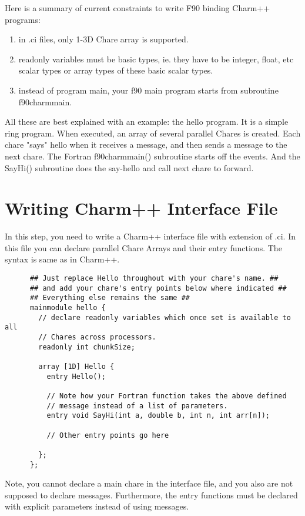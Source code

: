 \documentclass[11pt]{article}
\begin{document}
Here is a summary of current constraints to write F90 binding Charm++ programs:
\begin{enumerate}
\item in .ci files, only 1-3D Chare array is supported.
\item readonly variables must be basic types, ie. they have to be integer, 
float, etc scalar types or array types of these basic scalar types.
\item instead of program main, your f90 main program starts from subroutine 
f90charmmain.
\end{enumerate}

All these are best explained with an example: the hello program.  It is a
simple ring program.  When executed, an array of several parallel
Chares is created.  Each chare "says" hello when it receives a
message, and then sends a message to the next chare. The Fortran f90charmmain() 
subroutine starts off the events.  And the SayHi() subroutine does the 
say-hello and call next chare to forward.

\section{Writing Charm++ Interface File}
In this step, you need to write a Charm++ interface file with extension of
.ci. In this file you can declare parallel Chare Arrays and their entry 
functions. The syntax is same as in Charm++.
\begin{verbatim}
      ## Just replace Hello throughout with your chare's name. ##
      ## and add your chare's entry points below where indicated ##
      ## Everything else remains the same ##
      mainmodule hello {
        // declare readonly variables which once set is available to all
        // Chares across processors.      
        readonly int chunkSize;

        array [1D] Hello {
          entry Hello();

          // Note how your Fortran function takes the above defined
          // message instead of a list of parameters.
          entry void SayHi(int a, double b, int n, int arr[n]);

          // Other entry points go here

        };              
      };
\end{verbatim}
Note, you cannot declare a main chare in the interface file, and you also are not 
supposed to declare messages. Furthermore, the entry functions must be 
declared with explicit parameters instead of using messages. 
\end{document}
